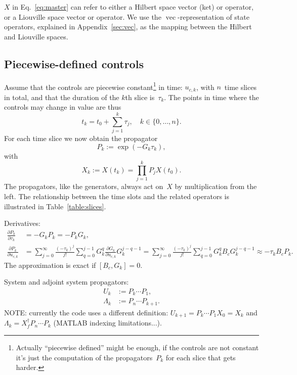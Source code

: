 \documentclass[aps, pra, a4paper, longbibliography]{revtex4}
\newcommand{\be}{\begin{equation}}
\newcommand{\ee}{\end{equation}}
\newcommand{\comm}[2]{\left[ #1, #2 \right]}
\DeclareMathOperator{\cvec}{vec}
\newcommand{\dd}[2]{\frac{\partial #1}{\partial #2}}
\begin{document}
$X$ in Eq.~\eqref{eq:master} can refer to either a Hilbert space
vector (ket) or operator, or a Liouville space vector
or operator.
We use the $\cvec$-representation of state
operators, explained in Appendix~\ref{sec:vec},
as the mapping between the Hilbert and Liouville spaces.

\subsection{Piecewise-defined controls}

Assume that the controls are
piecewise constant\footnote{Actually ``piecewise defined'' might be
  enough, if the controls are not constant it's just the computation
  of the propagators~$P_k$ for each slice that gets harder.}
in time: $u_{c, k}$, with $n$~time slices in total,
and that the duration of the $k$th slice is~$\tau_k$.
The points in time where the controls may change in value are thus
\be
t_k = t_0 + \sum_{j=1}^{k} \tau_j, \quad k \in \{0, \ldots, n\}.
\ee
For each time slice we now obtain the propagator
\be
P_k := \exp(-G_k \tau_k),
\ee
with
\be
X_k := X(t_k) = \prod_{j=1}^{k} P_j X(t_0).
\ee
The propagators, like the generators, always act on~$X$ by multiplication
from the left.
The relationship between the time slots and the related operators is
illustrated in Table~\ref{table:slices}.


Derivatives:
\begin{align}
\dd{P_k}{\tau_k}  &= -G_k P_k = -P_k G_k,\\
\dd{P_k}{u_{c,k}}
&=
\sum_{j=0}^{\infty} \frac{(-\tau_k)^j}{j!}
\sum_{q=0}^{j-1}
G_k^{q} \dd{G_k}{u_{c,k}} G_k^{j-q-1}
=
\sum_{j=0}^{\infty} \frac{(-\tau_k)^j}{j!}
\sum_{q=0}^{j-1}
G_k^{q} B_c G_k^{j-q-1}
\approx -\tau_k B_c P_k.
\end{align}
The approximation is exact if $\comm{B_c}{G_k} = 0$.


System and adjoint system propagators:
\begin{align}
U_k &:= P_k \cdots P_1,\\      %
\Lambda_k &:= P_n \cdots P_{k+1}.
\end{align}
NOTE: currently the code uses a different definition:
$U_{k+1} = P_k \cdots P_1 X_0 = X_k$ and
$\Lambda_k = X_f^\dagger P_n \cdots P_k$ (MATLAB indexing limitations...).
\end{document}
